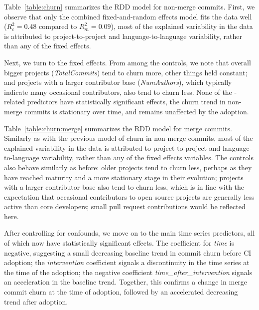 Table~\ref{table:churn} summarizes the RDD model for non-merge commits.
First, we observe that only the combined fixed-and-random effects model fits the 
data well ($R_c^2 = 0.48$ compared to $R_m^2 = 0.09$), \ie most of the explained 
variability in the data is attributed to project-to-project and language-to-language
variability, rather than any of the fixed effects.%

Next, we turn to the fixed effects.
From among the controls, we note that overall bigger projects (\emph{TotalCommits}) 
tend to churn more, other things held constant; and projects with a larger contributor 
base (\emph{NumAuthors}), which typically indicate many occasional contributors, 
also tend to churn less.
None of the \Tvi-related predictors have statistically significant effects,
\ie the churn trend in non-merge commits is stationary over time, and 
remains unaffected by the \Tvis adoption.

Table~\ref{table:churn:merge} summarizes the RDD model for merge commits.
Similarly as with the previous model of churn in non-merge commits, most of 
the explained variability in the data is attributed to project-to-project and 
language-to-language variability, rather than any of the fixed effects variables.
The controls also behave similarly as before: older projects tend to churn less, 
perhaps as they have reached maturity and a more stationary stage in their 
evolution; projects with a larger contributor base also tend to churn less, which 
is in line with the expectation that occasional contributors to open source projects 
are generally less active than core developers; small pull request contributions
would be reflected here.

After controlling for confounds, we move on to the main time series predictors,
all of which now have statistically significant effects.
The coefficient for \emph{time} is negative, suggesting a small decreasing
baseline trend in commit churn before CI adoption; the \emph{intervention}
coefficient signals a discontinuity in the time series at the time of the \Tvis
adoption; the negative coefficient \emph{time\_after\_intervention} signals
an acceleration in the baseline trend.
Together, this confirms a change in merge commit churn at the time 
of adoption, followed by an accelerated decreasing trend after adoption.

